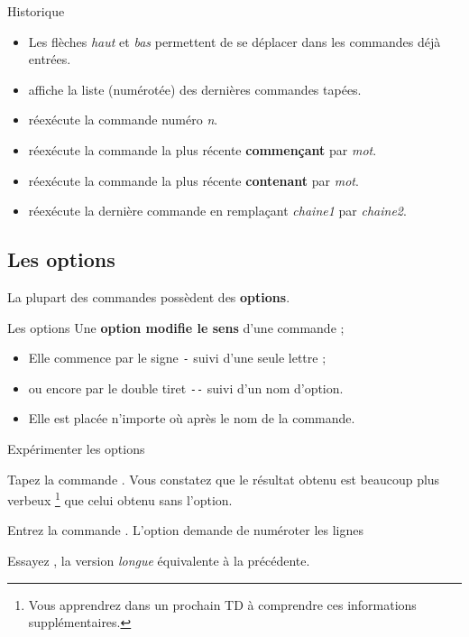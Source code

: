 \documentclass[a4paper,11pt]{style-esi/td}
\begin{document}
		\begin{theorie}{Historique}
			\begin{itemize}
			\item 
				Les flèches \emph{haut} et \emph{bas}
				permettent de se déplacer dans les commandes déjà entrées.
			\item 
				 affiche la liste (numérotée)
				des dernières commandes tapées.
			\item 
				 réexécute la commande numéro \emph{n}.
			\item 
				 réexécute la commande la plus récente 
				\textbf{commençant} par \emph{mot}.
			\item 
				 réexécute la commande la plus récente 
				\textbf{contenant} par \emph{mot}.
			\item 
				 réexécute la dernière commande
				en remplaçant \emph{chaine1} par \emph{chaine2}.
			\end{itemize}
		\end{theorie}

	\subsection{Les options}
	
		La plupart des commandes possèdent des \textbf{options}.

		\begin{theorie}{Les options}
			Une \textbf{option modifie le sens} d'une commande ;
			\begin{itemize}
			\item Elle commence par le signe \texttt{-} suivi d'une seule lettre ;
			\item ou encore par le double tiret \texttt{-{}-} suivi d'un nom d'option.
			\item Elle est placée n'importe où après le nom de la commande.   
			\end{itemize}
		\end{theorie}		

		\begin{Experience}{Expérimenter les options}		
			\vspace{-1em}
			\begin{steps}
			\item Tapez la commande . 
				Vous constatez que le résultat obtenu est beaucoup plus verbeux%
				\footnote{%
					Vous apprendrez dans un prochain TD 
					à comprendre ces informations supplémentaires.
				} 
				que celui obtenu sans l'option.
			\item Entrez la commande . 
				L'option demande de numéroter les lignes 
			\item Essayez ,
				la version \textit{longue} équivalente à la précédente.
			\end{steps}
		\end{Experience}
\end{document}
